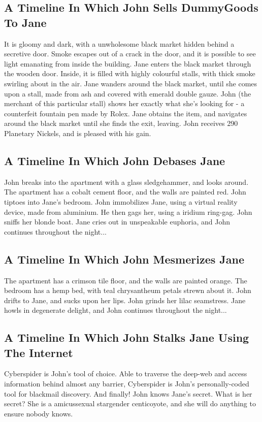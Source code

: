 \documentclass{article}
\begin{document}
\subsection{A Timeline In Which John Sells DummyGoods To Jane}


It is gloomy and dark, with a unwholesome black market hidden behind a secretive door.
Smoke escapes out of a crack in the door, and it is possible to see light emanating from inside the building.
Jane enters the black market through the wooden door.
Inside, it is filled with highly colourful stalls, with thick smoke swirling about in the air.
Jane wanders around the black market, until she comes upon a stall, made from ash and covered with emerald double gauze.
John (the merchant of this particular stall) shows her exactly what she's looking for {-} a counterfeit fountain pen made by Rolex.
Jane obtains the item, and navigates around the black market until she finds the exit, leaving.
John receives 290 Planetary Nickels, and is pleased with his gain.
\subsection{A Timeline In Which John Debases Jane}


John breaks into the apartment with a glass sledgehammer, and looks around.
The apartment has a cobalt cement floor, and the walls are painted red.
John tiptoes into Jane's bedroom.
John immobilizes Jane, using a virtual reality device, made from aluminium.
He then gags her, using a iridium ring{-}gag.
John sniffs her blonde boat.
Jane cries out in unspeakable euphoria, and John continues throughout the night...
\subsection{A Timeline In Which John Mesmerizes Jane}


The apartment has a crimson tile floor, and the walls are painted orange.
The bedroom has a hemp bed, with teal chrysantheum petals strewn about it.
John drifts to Jane, and sucks upon her lips.
John grinds her lilac seamstress.
Jane howls in degenerate delight, and John continues throughout the night...
\subsection{A Timeline In Which John Stalks Jane Using The Internet}


Cyberspider is John's tool of choice. Able to traverse the deep{-}web and access information behind almost any barrier, Cyberspider is John's personally{-}coded tool for blackmail discovery.
And finally!
John knows Jane's secret. What is her secret? She is a amicussexual stargender centicoyote, and she will do anything to ensure nobody knows.
\end{document}
